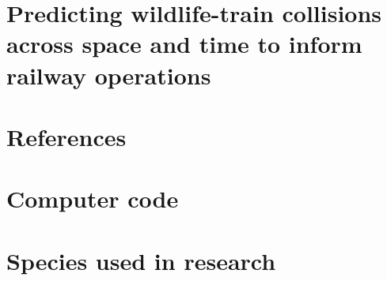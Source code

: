 \documentclass[titlesmallcaps,copyrightpage,examinerscopy]{uomthesis}
\begin{document}
%
\chapter{Predicting wildlife-train collisions across space and time to inform railway operations}\label{sec:train}
\clearpage{\pagestyle{empty}\cleardoublepage}


\clearpage{\pagestyle{empty}\cleardoublepage}


\clearpage{\pagestyle{empty}\cleardoublepage}

%

{
\backmatter
\chapter{References}

\clearpage{\pagestyle{empty}\cleardoublepage}
}

\let\svaddcontentsline\addcontentsline %
\renewcommand\addcontentsline[3]{%
  \ifthenelse{\equal{#1}{lof}}{}%
  {\ifthenelse{\equal{#1}{lot}}{}{\svaddcontentsline{#1}{#2}{#3}}}}

\clearpage
\appendix
{}
\clearpage{\pagestyle{empty}\cleardoublepage}

%
\chapter{Computer code}\label{apx:A}
\clearpage{\pagestyle{empty}\cleardoublepage}

%
\chapter{Species used in research}\label{apx:B}
\clearpage{\pagestyle{empty}\cleardoublepage}
\end{document}
